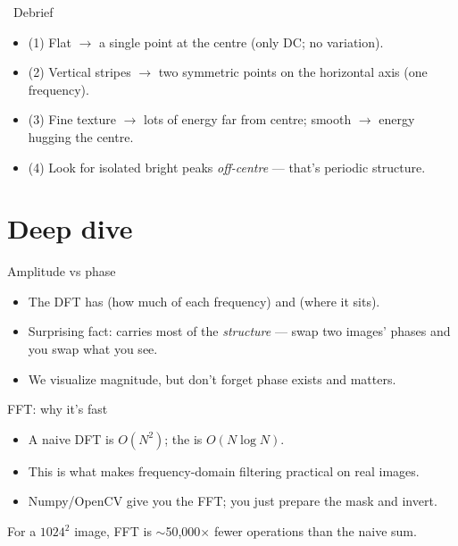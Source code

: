 \documentclass[10pt,aspectratio=169]{beamer}
\begin{document}
\begin{frame}{\faPen~Debrief}
  \begin{itemize}
    \item (1) Flat $\rightarrow$ a single point at the centre (only DC; no variation).
    \item (2) Vertical stripes $\rightarrow$ two symmetric points on the horizontal axis (one frequency).
    \item (3) Fine texture $\rightarrow$ lots of energy far from centre; smooth $\rightarrow$ energy hugging the centre.
    \item (4) Look for isolated bright peaks \emph{off-centre} — that's periodic structure.
  \end{itemize}
\end{frame}

\section{Deep dive}

\begin{frame}{Amplitude vs phase}
  \begin{itemize}
    \item The DFT has  (how much of each frequency) and  (where it sits).
    \item Surprising fact:  carries most of the \emph{structure} — swap two images' phases and you swap what you see.
    \item We visualize magnitude, but don't forget phase exists and matters.
  \end{itemize}
\end{frame}

\begin{frame}{FFT: why it's fast}
  \begin{itemize}
    \item A naive DFT is $O(N^2)$; the  is $O(N\log N)$.
    \item This is what makes frequency-domain filtering practical on real images.
    \item Numpy/OpenCV give you the FFT; you just prepare the mask and invert.
  \end{itemize}
  \begin{mathbox}
    For a $1024^2$ image, FFT is $\sim$50{,}000$\times$ fewer operations than the naive sum.
  \end{mathbox}
\end{frame}
\end{document}
